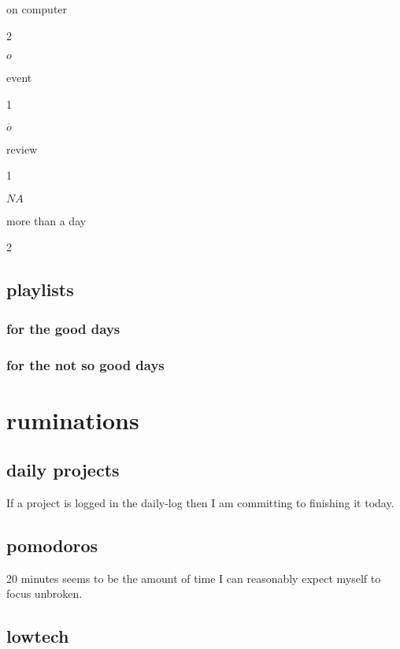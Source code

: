 \documentclass[]{book}
\begin{document}
on computer

2

\(o\)

event

1

\(\overline o\)

review

1

\(NA\)

more than a day

2

\hypertarget{playlists}{%
\section{playlists}\label{playlists}}

\hypertarget{for-the-good-days}{%
\subsection{for the good days}\label{for-the-good-days}}

\hypertarget{for-the-not-so-good-days}{%
\subsection{for the not so good days}\label{for-the-not-so-good-days}}

\hypertarget{ruminations}{%
\chapter{ruminations}\label{ruminations}}

\hypertarget{daily-projects}{%
\section{daily projects}\label{daily-projects}}

If a project is logged in the \protect\hypertarget{daily-log}{}{daily-log} then I am committing to finishing it today.

\hypertarget{pomodoros}{%
\section{pomodoros}\label{pomodoros}}

20 minutes seems to be the amount of time I can reasonably expect myself to focus unbroken.

\hypertarget{lowtech}{%
\section{lowtech}\label{lowtech}}
\end{document}
